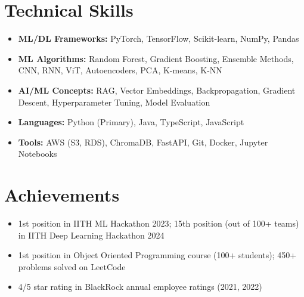 \documentclass[11pt,a4paper]{article}
\newcommand{\resumeItem}[1]{\item\small{#1}}
\begin{document}
\section{Technical Skills}
\begin{itemize}[leftmargin=*,noitemsep,topsep=0pt]
    \resumeItem{\textbf{ML/DL Frameworks:} PyTorch, TensorFlow, Scikit-learn, NumPy, Pandas}
    \resumeItem{\textbf{ML Algorithms:} Random Forest, Gradient Boosting, Ensemble Methods, CNN, RNN, ViT, Autoencoders, PCA, K-means, K-NN}
    \resumeItem{\textbf{AI/ML Concepts:} RAG, Vector Embeddings, Backpropagation, Gradient Descent, Hyperparameter Tuning, Model Evaluation}
    \resumeItem{\textbf{Languages:} Python (Primary), Java, TypeScript, JavaScript}
    \resumeItem{\textbf{Tools:} AWS (S3, RDS), ChromaDB, FastAPI, Git, Docker, Jupyter Notebooks}
\end{itemize}

\section{Achievements}
\begin{itemize}[leftmargin=*,noitemsep,topsep=0pt]
    \resumeItem{1st position in IITH ML Hackathon 2023; 15th position (out of 100+ teams) in IITH Deep Learning Hackathon 2024}
    \resumeItem{1st position in Object Oriented Programming course (100+ students); 450+ problems solved on LeetCode}
    \resumeItem{4/5 star rating in BlackRock annual employee ratings (2021, 2022)}
\end{itemize}
\end{document}
